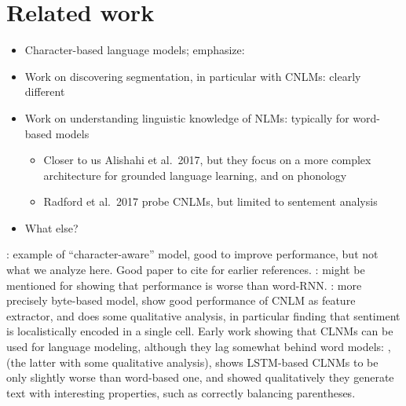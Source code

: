 \section{Related work}
\label{sec:related}

\begin{itemize}
\item Character-based language models; emphasize:
\item Work on discovering segmentation, in particular with CNLMs:
  clearly different
\item Work on understanding linguistic knowledge of NLMs: typically
  for word-based models
  \begin{itemize}
  \item Closer to us Alishahi et al.~2017, but they focus on a more
    complex architecture for grounded language learning, and on
    phonology
  \item Radford et al.~2017 probe CNLMs, but limited to sentement
    analysis
  \end{itemize}
\item What else?
\end{itemize}


 \cite{Gerz:etal:2018}: example of
``character-aware'' model, good to improve performance, but not what
we analyze here. Good paper to cite for earlier
references. \cite{Bojanowski:etal:2016}: might be mentioned for
showing that performance is worse than
word-RNN. \cite{Radford:etal:2017}: more precisely byte-based model, show good performance of CNLM as feature extractor, and does some qualitative analysis, in particular finding that sentiment is localistically encoded in a single cell. Early work showing that CLNMs can be used for language modeling, although they lag somewhat behind word models: \cite{Mikolov:etal:2011}, \cite{Sutskever:etal:2011} (the latter with some qualitative analysis),  \cite{Graves:2014} shows LSTM-based CLNMs to be only slightly worse than word-based one, and showed qualitatively they generate text with interesting properties, such as correctly balancing parentheses.

